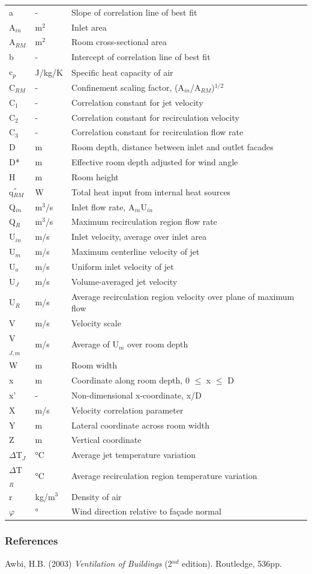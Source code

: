 \begin{longtable}[c]{p{1.0in}p{1.0in}p{3.5in}}
a & - & Slope of correlation line of best fit \tabularnewline
A\(_{in}\) & m\(^2\) & Inlet area \tabularnewline
A\(_{RM}\) & m\(^2\) & Room cross-sectional area \tabularnewline
b & - & Intercept of correlation line of best fit \tabularnewline
c\(_{p}\) & J/kg/K & Specific heat capacity of air \tabularnewline
C\(_{RM}\) & - & Confinement scaling factor, (A\(_{in}\)/A\(_{RM}\))\(^{1/2}\) \tabularnewline
C\(_{1}\) & - & Correlation constant for jet velocity \tabularnewline
C\(_{2}\) & - & Correlation constant for recirculation velocity \tabularnewline
C\(_{3}\) & - & Correlation constant for recirculation flow rate \tabularnewline
D & m & Room depth, distance between inlet and outlet facades \tabularnewline
D* & m & Effective room depth adjusted for wind angle \tabularnewline
H & m & Room height \tabularnewline
q\(^{''}_{RM}\) & W & Total heat input from internal heat sources \tabularnewline
Q\(_{in}\) & m\(^3\)/s & Inlet flow rate, A\(_{in}\)U\(_{in}\) \tabularnewline
Q\(_R\) & m\(^3\)/s & Maximum recirculation region flow rate \tabularnewline
U\(_{in}\) & m/s & Inlet velocity, average over inlet area \tabularnewline
U\(_{m}\) & m/s & Maximum centerline velocity of jet \tabularnewline
U\(_{o}\) & m/s & Uniform inlet velocity of jet \tabularnewline
U\(_{J}\) & m/s & Volume-averaged jet velocity \tabularnewline
U\(_{R}\) & m/s & Average recirculation region velocity over plane of maximum flow \tabularnewline
V & m/s & Velocity scale \tabularnewline
V\(_{J,m}\) & m/s & Average of U\(_{m}\) over room depth \tabularnewline
W & m & Room width \tabularnewline
x & m & Coordinate along room depth, 0 $\leq$ x $\leq$ D \tabularnewline
x' & - & Non-dimensional x-coordinate, x/D \tabularnewline
X & m/s & Velocity correlation parameter \tabularnewline
Y & m & Lateral coordinate across room width \tabularnewline
Z & m & Vertical coordinate \tabularnewline
$\Delta$T\(_{J}\) & °C & Average jet temperature variation \tabularnewline
$\Delta$T\(_{R}\) & °C & Average recirculation region temperature variation \tabularnewline
r & kg/m\(^3\) & Density of air \tabularnewline
$\varphi$ & ° & Wind direction relative to façade normal \tabularnewline
\bottomrule
\end{longtable}

\subsubsection{References}\label{references-5-000}

Awbi, H.B. (2003) \emph{Ventilation of Buildings} (2\(^{nd}\) edition). Routledge, 536pp.

